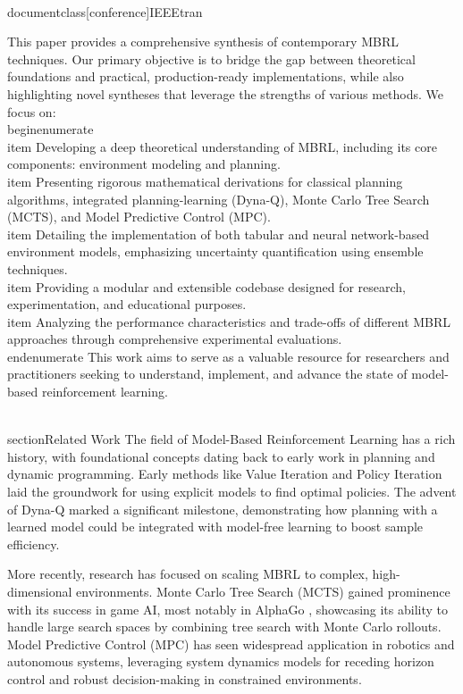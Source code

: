 \\documentclass[conference]{IEEEtran}
\begin{document}
This paper provides a comprehensive synthesis of contemporary MBRL techniques. Our primary objective is to bridge the gap between theoretical foundations and practical, production-ready implementations, while also highlighting novel syntheses that leverage the strengths of various methods. We focus on:
\\begin{enumerate}
    \\item Developing a deep theoretical understanding of MBRL, including its core components: environment modeling and planning.
    \\item Presenting rigorous mathematical derivations for classical planning algorithms, integrated planning-learning (Dyna-Q), Monte Carlo Tree Search (MCTS), and Model Predictive Control (MPC).
    \\item Detailing the implementation of both tabular and neural network-based environment models, emphasizing uncertainty quantification using ensemble techniques.
    \\item Providing a modular and extensible codebase designed for research, experimentation, and educational purposes.
    \\item Analyzing the performance characteristics and trade-offs of different MBRL approaches through comprehensive experimental evaluations.
\\end{enumerate}
This work aims to serve as a valuable resource for researchers and practitioners seeking to understand, implement, and advance the state of model-based reinforcement learning.

\\section{Related Work}
The field of Model-Based Reinforcement Learning has a rich history, with foundational concepts dating back to early work in planning and dynamic programming. Early methods like Value Iteration and Policy Iteration \cite{bellman1957dynamic} laid the groundwork for using explicit models to find optimal policies. The advent of Dyna-Q \cite{sutton1990integrated} marked a significant milestone, demonstrating how planning with a learned model could be integrated with model-free learning to boost sample efficiency.

More recently, research has focused on scaling MBRL to complex, high-dimensional environments. Monte Carlo Tree Search (MCTS) \cite{browne2012mcts} gained prominence with its success in game AI, most notably in AlphaGo \cite{silver2016mastering}, showcasing its ability to handle large search spaces by combining tree search with Monte Carlo rollouts. Model Predictive Control (MPC) \cite{camacho2013model} has seen widespread application in robotics and autonomous systems, leveraging system dynamics models for receding horizon control and robust decision-making in constrained environments.
\end{document}
